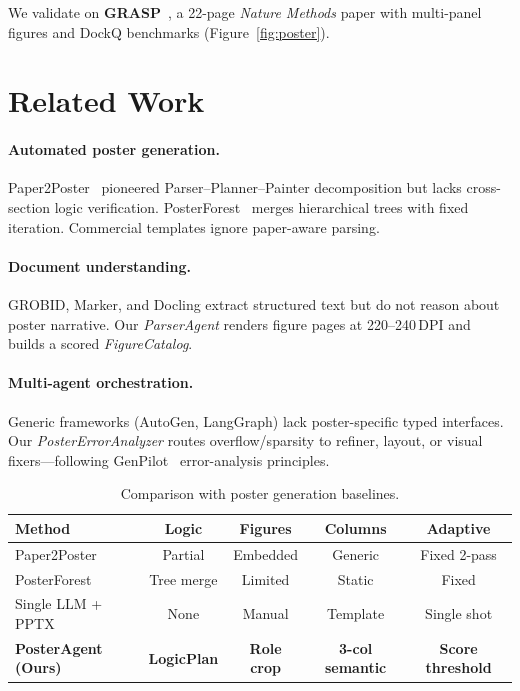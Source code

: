 \documentclass{article}
\begin{document}
We validate on \textbf{GRASP}~\citep{zhang2025grasp}, a 22-page \emph{Nature Methods} paper with multi-panel figures and DockQ benchmarks (Figure~\ref{fig:poster}).

\section{Related Work}
\label{sec:related}

\paragraph{Automated poster generation.}
Paper2Poster~\citep{paper2poster2024} pioneered Parser--Planner--Painter decomposition but lacks cross-section logic verification. PosterForest~\citep{posterforest2024} merges hierarchical trees with fixed iteration. Commercial templates ignore paper-aware parsing.

\paragraph{Document understanding.}
GROBID, Marker, and Docling extract structured text but do not reason about poster narrative. Our \emph{ParserAgent} renders figure pages at 220--240\,DPI and builds a scored \emph{FigureCatalog}.

\paragraph{Multi-agent orchestration.}
Generic frameworks (AutoGen, LangGraph) lack poster-specific typed interfaces. Our \emph{PosterErrorAnalyzer} routes overflow/sparsity to refiner, layout, or visual fixers---following GenPilot~\citep{genpilot2024} error-analysis principles.

\begin{table}[t]
  \centering
  \caption{Comparison with poster generation baselines.}
  \label{tab:compare}
  \small
  \begin{tabular}{lcccc}
    \toprule
    Method & Logic & Figures & Columns & Adaptive \\
    \midrule
    Paper2Poster & Partial & Embedded & Generic & Fixed 2-pass \\
    PosterForest & Tree merge & Limited & Static & Fixed \\
    Single LLM + PPTX & None & Manual & Template & Single shot \\
    \textbf{PosterAgent (Ours)} & \textbf{LogicPlan} & \textbf{Role crop} & \textbf{3-col semantic} & \textbf{Score threshold} \\
    \bottomrule
  \end{tabular}
\end{table}
\end{document}

